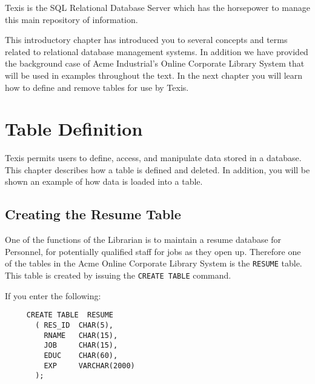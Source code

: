 Texis is the SQL Relational Database Server which has the horsepower
to manage this main repository of information.

This introductory chapter has introduced you to several concepts and
terms related to relational database management systems.  In addition
we have provided the background case of Acme Industrial's Online
Corporate Library System that will be used in examples throughout the
text.  In the next chapter you will learn how to define and remove
tables for use by Texis.

\chapter{Table Definition}{\label{chp:TabDef}}

Texis permits users to define, access, and manipulate data stored in a
database.  This chapter describes how a table is defined and deleted.
In addition, you will be shown an example of how data is loaded into a
table.

\section{Creating the Resume Table}

One of the functions of the Librarian is to maintain a resume database
for Personnel, for potentially qualified staff for jobs as they open
up.  Therefore one of the tables in the Acme Online Corporate Library
System is the {\tt RESUME} table.  This table is created by issuing the
{\tt CREATE TABLE} command.

If you enter the following:
\begin{verbatim}
     CREATE TABLE  RESUME
       ( RES_ID  CHAR(5),
         RNAME   CHAR(15),
         JOB     CHAR(15),
         EDUC    CHAR(60),
         EXP     VARCHAR(2000)
       );
\end{verbatim}


